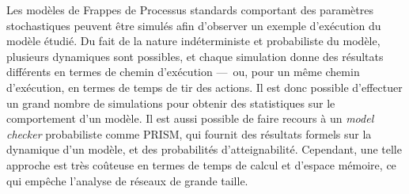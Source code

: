 Les modèles de Frappes de Processus standards comportant des paramètres stochastiques
peuvent être simulés afin d'observer un exemple d'exécution du modèle étudié.
Du fait de la nature indéterministe et probabiliste du modèle, plusieurs dynamiques
sont possibles, et chaque simulation donne des résultats différents en termes
de chemin d'exécution ---~ou, pour un même chemin d'exécution,
en termes de temps de tir des actions.
Il est donc possible d'effectuer un grand nombre de simulations pour obtenir des
statistiques sur le comportement d'un modèle.
Il est aussi possible de faire recours à un \textit{model checker} probabiliste
comme PRISM, qui fournit des résultats formels sur la dynamique d'un modèle,
et des probabilités d'atteignabilité.
Cependant, une telle approche est très coûteuse en termes de temps de calcul
et d'espace mémoire, ce qui empêche l'analyse de réseaux de grande taille.
